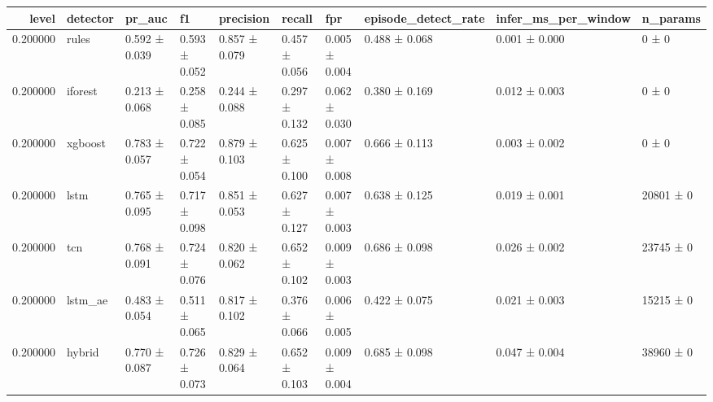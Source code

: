 \begin{tabular}{rlllllllll}
\toprule
level & detector & pr\_auc & f1 & precision & recall & fpr & episode\_detect\_rate & infer\_ms\_per\_window & n\_params \\
\midrule
0.200000 & rules & 0.592 ± 0.039 & 0.593 ± 0.052 & 0.857 ± 0.079 & 0.457 ± 0.056 & 0.005 ± 0.004 & 0.488 ± 0.068 & 0.001 ± 0.000 & 0 ± 0 \\
0.200000 & iforest & 0.213 ± 0.068 & 0.258 ± 0.085 & 0.244 ± 0.088 & 0.297 ± 0.132 & 0.062 ± 0.030 & 0.380 ± 0.169 & 0.012 ± 0.003 & 0 ± 0 \\
0.200000 & xgboost & 0.783 ± 0.057 & 0.722 ± 0.054 & 0.879 ± 0.103 & 0.625 ± 0.100 & 0.007 ± 0.008 & 0.666 ± 0.113 & 0.003 ± 0.002 & 0 ± 0 \\
0.200000 & lstm & 0.765 ± 0.095 & 0.717 ± 0.098 & 0.851 ± 0.053 & 0.627 ± 0.127 & 0.007 ± 0.003 & 0.638 ± 0.125 & 0.019 ± 0.001 & 20801 ± 0 \\
0.200000 & tcn & 0.768 ± 0.091 & 0.724 ± 0.076 & 0.820 ± 0.062 & 0.652 ± 0.102 & 0.009 ± 0.003 & 0.686 ± 0.098 & 0.026 ± 0.002 & 23745 ± 0 \\
0.200000 & lstm\_ae & 0.483 ± 0.054 & 0.511 ± 0.065 & 0.817 ± 0.102 & 0.376 ± 0.066 & 0.006 ± 0.005 & 0.422 ± 0.075 & 0.021 ± 0.003 & 15215 ± 0 \\
0.200000 & hybrid & 0.770 ± 0.087 & 0.726 ± 0.073 & 0.829 ± 0.064 & 0.652 ± 0.103 & 0.009 ± 0.004 & 0.685 ± 0.098 & 0.047 ± 0.004 & 38960 ± 0 \\
\bottomrule
\end{tabular}

